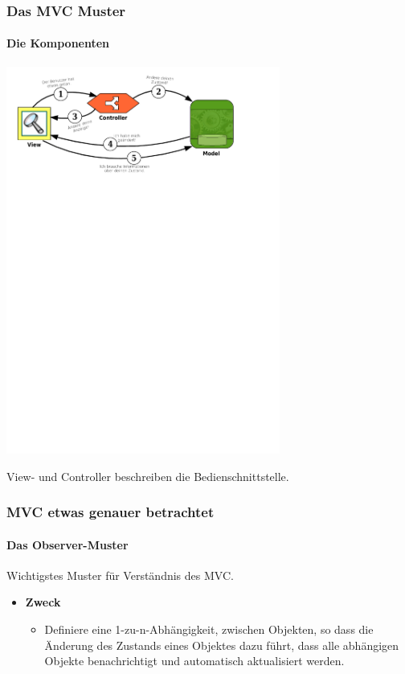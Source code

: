 \begin{frame}
	\frametitle{Das MVC Muster}
	\framesubtitle{Die Komponenten}
	\begin{center}
		\includegraphics[trim = 0mm 207.7mm 28.6mm 0mm, clip, width=9cm]{../mvc/mvc-schema.pdf}
	\end{center}
	\begin{center}
		View- und Controller beschreiben die Bedienschnittstelle.
	\end{center}
\end{frame}

\begin{frame}
	\frametitle{MVC etwas genauer betrachtet}
	\framesubtitle{Das Observer-Muster}
	\begin{center}
		 Wichtigstes Muster für Verständnis des MVC.
	\end{center}
	\begin{itemize}
		\item {\bf Zweck}
		\begin{itemize}
			\item Definiere eine 1-zu-n-Abhängigkeit, zwischen Objekten, so dass die Änderung des
			Zustands eines Objektes dazu führt, dass alle abhängigen Objekte benachrichtigt
			und automatisch aktualisiert werden.
		\end{itemize}
	\end{itemize}
\end{frame}

